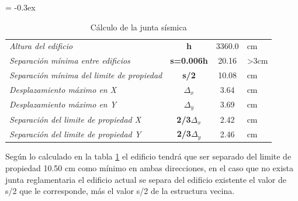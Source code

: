 \documentclass{article}%
\begin{document}
%


\begin{table}[H]%
\centering%
\caption{Cálculo de la junta sísmica}%
\extrarowheight = -0.3ex%
\renewcommand{\arraystretch}{1.5}%
\begin{tabular}{l|c|c|l}%
\cline{2-3}%
\textit{Altura del edificio} & \textbf{h} & {3360.0} & {cm} \\%
\cline{2-3}%
\textit{Separación mínima entre edificios} & \textbf{s=0.006h} & {20.16} & {>3cm} \\%
\cline{2-3}%
\textit{Separación mínima del limite de propiedad} & \textbf{s/2} & {10.08} & {cm} \\%
\cline{2-3}%
\textit{Desplazamiento máximo en X} & \textbf{$\Delta_x$} & {3.64} & {cm} \\%
\cline{2-3}%
\textit{Desplazamiento máximo en Y} & \textbf{$\Delta_y$} & {3.69} & {cm} \\%
\cline{2-3}%
\textit{Separación del limite de propiedad X} & \textbf{2/3$\Delta_{x}$} & {2.42} & {cm} \\%
\cline{2-3}%
\textit{Separación del limite de propiedad Y} & \textbf{2/3$\Delta_{y}$} & {2.46} & {cm} \\%
\cline{2-3}%
\end{tabular}%
\label{tab:junta_sis}%
\end{table}

%
Según lo calculado en la tabla \ref{tab:junta_sis} %
 el edificio tendrá que ser separado del limite de propiedad 10.50 cm como mínimo en ambas direcciones, en el caso que no exista junta reglamentaria el edificio actual se separa del edificio existente el valor de s/2 que le corresponde, más el valor s/2 de la estructura vecina.

%
\end{document}
